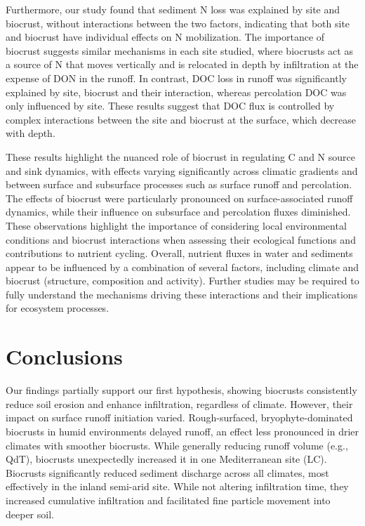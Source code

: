 Furthermore, our study found that sediment N loss was explained by site and biocrust, without interactions between the two factors, indicating that both site and biocrust have individual effects on N mobilization. The importance of biocrust suggests similar mechanisms in each site studied, where biocrusts act as a source of N that moves vertically and is relocated in depth by infiltration at the expense of DON in the runoff. In contrast, DOC loss in runoff was significantly explained by site, biocrust and their interaction, whereas percolation DOC was only influenced by site. These results suggest that DOC flux is controlled by complex interactions between the site and biocrust at the surface, which decrease with depth.

These results highlight the nuanced role of biocrust in regulating C and N source and sink dynamics, with effects varying significantly across climatic gradients and between surface and subsurface processes such as surface runoff and percolation. The effects of biocrust were particularly pronounced on surface-associated runoff dynamics, while their influence on subsurface and percolation fluxes diminished. These observations highlight the importance of considering local environmental conditions and biocrust interactions when assessing their ecological functions and contributions to nutrient cycling. Overall, nutrient fluxes in water and sediments appear to be influenced by a combination of several factors, including climate and biocrust (structure, composition and activity). Further studies may be required to fully understand the mechanisms driving these interactions and their implications for ecosystem processes.

\section{Conclusions}

Our findings partially support our first hypothesis, showing biocrusts consistently reduce soil erosion and enhance infiltration, regardless of climate. However, their impact on surface runoff initiation varied. Rough-surfaced, bryophyte-dominated biocrusts in humid environments delayed runoff, an effect less pronounced in drier climates with smoother biocrusts. While generally reducing runoff volume (e.g., QdT), biocrusts unexpectedly increased it in one Mediterranean site (LC). Biocrusts significantly reduced sediment discharge across all climates, most effectively in the inland semi-arid site. While not altering infiltration time, they increased cumulative infiltration and facilitated fine particle movement into deeper soil.

